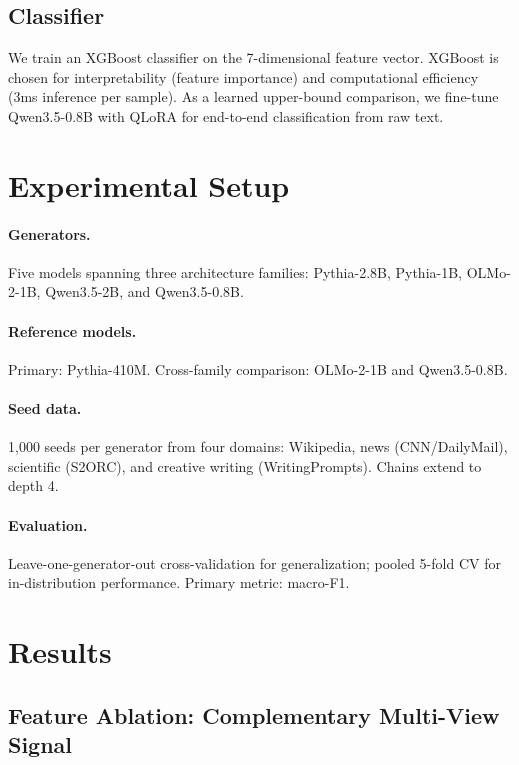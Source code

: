 \documentclass[letterpaper,11pt]{article}
\begin{document}
\subsection{Classifier}

We train an XGBoost classifier on the 7-dimensional feature vector. XGBoost is chosen for interpretability (feature importance) and computational efficiency (3ms inference per sample). As a learned upper-bound comparison, we fine-tune Qwen3.5-0.8B with QLoRA for end-to-end classification from raw text.

\section{Experimental Setup}
\label{sec:setup}

\paragraph{Generators.} Five models spanning three architecture families: Pythia-2.8B, Pythia-1B, OLMo-2-1B, Qwen3.5-2B, and Qwen3.5-0.8B.

\paragraph{Reference models.} Primary: Pythia-410M. Cross-family comparison: OLMo-2-1B and Qwen3.5-0.8B.

\paragraph{Seed data.} 1,000 seeds per generator from four domains: Wikipedia, news (CNN/DailyMail), scientific (S2ORC), and creative writing (WritingPrompts). Chains extend to depth 4.

\paragraph{Evaluation.} Leave-one-generator-out cross-validation for generalization; pooled 5-fold CV for in-distribution performance. Primary metric: macro-F1.

\section{Results}
\label{sec:results}

\subsection{Feature Ablation: Complementary Multi-View Signal}
\label{sec:ablation}
\end{document}
